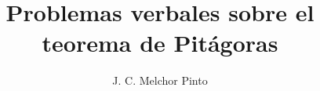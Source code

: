 \documentclass[12pt]{guia}
\title{Problemas verbales sobre el teorema de Pitágoras}
\author{J. C. Melchor Pinto}
\begin{document}
\pagestyle{headandfoot}
\addpoints
\INFO
\printanswers

\newpage
\begin{questions}
    \questionboxed[10] 
    \questionboxed[10] 
    \questionboxed[10] 
    \questionboxed[10] 
    \questionboxed[10] 
    \questionboxed[10] 
    \questionboxed[10] 
    \questionboxed[10] 
    \questionboxed[10] 
\end{questions}
\end{document}
